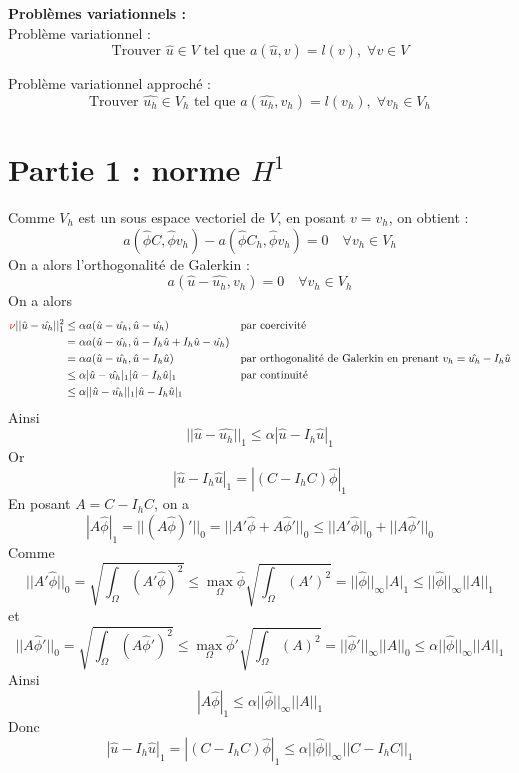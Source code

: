 \documentclass[french]{article}
\begin{document}
	\textbf{Problèmes variationnels :} \\
	
	Problème variationnel :
	$$\text{Trouver } \hat{u}\in V \text{ tel que } a(\hat{u},v)=l(v), \;\forall v\in V$$
	
	Problème variationnel approché :
	$$\text{Trouver } \hat{u_h}\in V_h \text{ tel que } a(\hat{u_h},v_h)=l(v_h), \;\forall v_h\in V_h$$
	
	\section{Partie 1 : norme $H^1$}
	
	Comme $V_h$ est un sous espace vectoriel de $V$, en posant $v=v_h$, on obtient :
	$$a(\hat{\phi}C,\hat{\phi}v_h)-a(\hat{\phi}C_h,\hat{\phi}v_h)=0 \quad \forall v_h\in V_h$$
	On a alors l'orthogonalité de Galerkin : \color{red}{(ATTENTION : Abus de notation sur $v_h$ !)}\color{black}
	$$a(\hat{u}-\hat{u_h},v_h)=0 \quad \forall v_h\in V_h$$
	On a alors
	\begin{align*}
		\color{red}{\nu}\color{black}||\hat{u}-\hat{u_h}||_1^2&\le\alpha a(\hat{u}-\hat{u_h},\hat{u}-\hat{u_h}) &&\text{par coercivité} \\
		&=\alpha a(\hat{u}-\hat{u_h},\hat{u}-I_h\hat{u}+I_h\hat{u}-\hat{u_h}) \\
		&=\alpha a(\hat{u}-\hat{u_h},\hat{u}-I_h\hat{u}) &&\text{par orthogonalité de Galerkin en prenant } v_h=\hat{u_h}-I_h\hat{u} \\
		&\le\alpha |\hat{u}-\hat{u_h}|_1|\hat{u}-I_h\hat{u}|_1 &&\text{par continuité} \\
		&\le\alpha ||\hat{u}-\hat{u_h}||_1|\hat{u}-I_h\hat{u}|_1
	\end{align*}
	Ainsi
	$$||\hat{u}-\hat{u_h}||_1\le\alpha|\hat{u}-I_h\hat{u}|_1$$
	Or 
	$$|\hat{u}-I_h\hat{u}|_1=|(C-I_hC)\hat{\phi}|_1$$
	En posant $A=C-I_hC$, on a
	$$|A\hat{\phi}|_1=||(A\hat{\phi})'||_0=||A'\hat{\phi}+A\hat{\phi}'||_0\le||A'\hat{\phi}||_0+||A\hat{\phi}'||_0$$
	Comme
	$$||A'\hat{\phi}||_0=\sqrt{\int_\Omega(A'\hat{\phi})^2}\le \max_\Omega \hat{\phi}\sqrt{\int_\Omega(A')^2}=||\hat{\phi}||_\infty|A|_1\le||\hat{\phi}||_\infty||A||_1$$
	et
	$$||A\hat{\phi}'||_0=\sqrt{\int_\Omega(A\hat{\phi}')^2}\le \max_\Omega \hat{\phi}'\sqrt{\int_\Omega(A)^2}=||\hat{\phi}'||_\infty||A||_0\le \alpha||\hat{\phi}||_\infty||A||_1$$
	Ainsi
	$$|A\hat{\phi}|_1\le\alpha ||\hat{\phi}||_\infty||A||_1$$
	Donc
	$$|\hat{u}-I_h\hat{u}|_1=|(C-I_hC)\hat{\phi}|_1\le\alpha ||\hat{\phi}||_\infty||C-I_hC||_1$$
\end{document}

